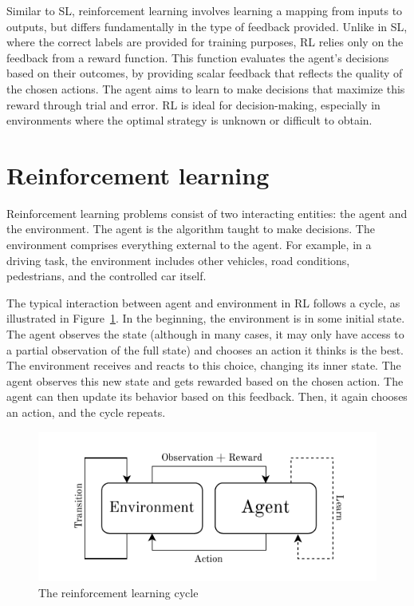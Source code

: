 \documentclass[
  digital,     %
  oneside,     %
  nosansbold,  %
  nocolorbold, %
  lof,         %
  lot,         %
]{fithesis4}
\begin{document}
Similar to SL, reinforcement learning involves learning a mapping from inputs to outputs, but differs fundamentally in the type of feedback provided. Unlike in SL, where the correct labels are provided for training purposes, RL relies only on the feedback from a reward function. This function evaluates the agent's decisions based on their outcomes, by providing scalar feedback that reflects the quality of the chosen actions. The agent aims to learn to make decisions that maximize this reward through trial and error. RL is ideal for decision-making, especially in environments where the optimal strategy is unknown or difficult to obtain.

\section{Reinforcement learning}
Reinforcement learning problems consist of two interacting entities: the agent and the environment. The agent is the algorithm taught to make decisions. The environment comprises everything external to the agent. For example, in a driving task, the environment includes other vehicles, road conditions, pedestrians, and the controlled car itself.

The typical interaction between agent and environment in RL follows a cycle, as illustrated in Figure~\ref{fig:rl-cycle}. In the beginning, the environment is in some initial state. The agent observes the state (although in many cases, it may only have access to a partial observation of the full state) and chooses an action it thinks is the best. The environment receives and reacts to this choice, changing its inner state. The agent observes this new state and gets rewarded based on the chosen action. The agent can then update its behavior based on this feedback. Then, it again chooses an action, and the cycle repeats.

\begin{figure}
    \centering
    \includegraphics[width=1\linewidth]{diagrams/rl_cycle.pdf}
    \caption{The reinforcement learning cycle}
    \label{fig:rl-cycle}
\end{figure}
\end{document}
